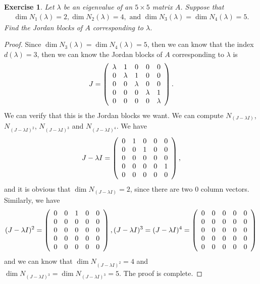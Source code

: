\documentclass[10pt]{book}
\newtheorem{exercise}{Exercise}[section]
\theoremstyle{definition}
\numberwithin{equation}{chapter}
\begin{document}
\begin{exercise}
Let $\lambda$ be an eigenvalue of an $5 \times 5$ matrix $A$. Suppose
that%
\begin{align*}
    \dim N_{1}\left(\lambda\right) = 2, \dim N_{2}\left(\lambda\right) = 4, 
    \text{ and } \dim N_{3}\left(\lambda\right) = \dim N_{4}\left(\lambda\right) = 5.
\end{align*}
Find the Jordan blocks of $A$ corresponding to $\lambda$.
\end{exercise}
\begin{proof}
Since $\dim N_{3}\left(\lambda\right) = \dim N_{4}\left(\lambda\right) = 5$, then we can know that the index $d(\lambda) = 3$, then we can know the Jordan blocks of $A$ corresponding to $\lambda$ is 
\begin{align*}
    J = \left(\begin{array}
    [c]{ccccc}%
    \lambda & 1 & 0 & 0 & 0\\
    0 & \lambda & 1 & 0 & 0\\
    0 & 0 & \lambda & 0 & 0\\
    0 & 0 & 0 & \lambda & 1\\
    0 & 0 & 0 & 0 & \lambda
    \end{array}\right).
\end{align*}
We can verify that this is the Jordan blocks we want. We can compute $N_{(J-\lambda I)}$, $N_{(J-\lambda I)^2}$, $N_{(J-\lambda I)^3}$ and $N_{(J-\lambda I)^4}$. We have
\begin{align*}
    J-\lambda I = \left(\begin{array}
    [c]{ccccc}%
    0 & 1 & 0 & 0 & 0\\
    0 & 0 & 1 & 0 & 0\\
    0 & 0 & 0 & 0 & 0\\
    0 & 0 & 0 & 0 & 1\\
    0 & 0 & 0 & 0 & 0
    \end{array}\right),
\end{align*}
and it is obvious that $\dim N_{(J-\lambda I)} = 2$, since there are two $0$ column vectors. Similarly, we have 
\begin{align*}
    (J-\lambda I)^2 = \left(\begin{array}
    [c]{ccccc}%
    0 & 0 & 1 & 0 & 0\\
    0 & 0 & 0 & 0 & 0\\
    0 & 0 & 0 & 0 & 0\\
    0 & 0 & 0 & 0 & 0\\
    0 & 0 & 0 & 0 & 0
    \end{array}\right), 
    (J-\lambda I)^3 = (J-\lambda I)^4 = \left(\begin{array}
    [c]{ccccc}%
    0 & 0 & 0 & 0 & 0\\
    0 & 0 & 0 & 0 & 0\\
    0 & 0 & 0 & 0 & 0\\
    0 & 0 & 0 & 0 & 0\\
    0 & 0 & 0 & 0 & 0
    \end{array}\right)
\end{align*}
and we can know that $\dim N_{(J-\lambda I)^2} = 4$ and $\dim N_{(J-\lambda I)^3} = \dim N_{(J-\lambda I)^3} = 5$. The proof is complete.
\end{proof}
\end{document}
